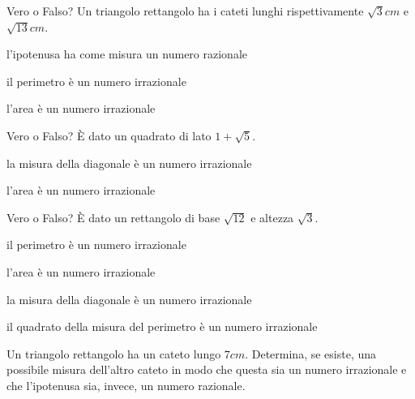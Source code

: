 \begin{esercizio}%
Vero o Falso? Un triangolo rettangolo ha i cateti lunghi rispettivamente $\sqrt 3\unit{cm}$ e $\sqrt{13}\unit{cm}$.

\TabPositions{11.5cm}
 \begin{enumeratea}
 \item l’ipotenusa ha come misura un numero razionale \tab\boxV\quad\boxF
 \item il perimetro è un numero irrazionale \tab\boxV\quad\boxF
 \item l'area è un numero irrazionale \tab\boxV\quad\boxF
 \end{enumeratea}
\end{esercizio}

\begin{esercizio}%
Vero o Falso? È dato un quadrato di lato $1+\sqrt 5$.

\TabPositions{11.5cm}
 \begin{enumeratea}
 \item la misura della diagonale è un numero irrazionale \tab\boxV\quad\boxF
 \item l'area è un numero irrazionale \tab\boxV\quad\boxF
 \end{enumeratea}
\end{esercizio}

\begin{esercizio}%
Vero o Falso? È dato un rettangolo di base $\sqrt{12}$ e altezza $\sqrt 3$.

\TabPositions{11.5cm}
 \begin{enumeratea}
 \item il perimetro è un numero irrazionale \tab\boxV\quad\boxF
 \item l’area è un numero irrazionale \tab\boxV\quad\boxF
 \item la misura della diagonale è un numero irrazionale \tab\boxV\quad\boxF
 \item il quadrato della misura del perimetro è un numero irrazionale \tab\boxV\quad\boxF
 \end{enumeratea}
\end{esercizio}

\begin{esercizio}%
Un triangolo rettangolo ha un cateto lungo $7\unit{cm}$. Determina, se esiste, una possibile misura dell’altro cateto in modo che questa sia un numero irrazionale e che l’ipotenusa sia, invece, un numero razionale.
\end{esercizio}

